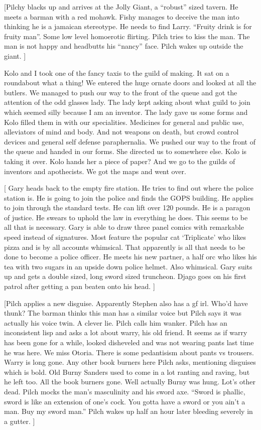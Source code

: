 [Pilchy blacks up and arrives at the Jolly Giant, a “robust” sized tavern. He meets a barman with a red mohawk. Fishy manages to deceive the man into thinking he is a jamaican stereotype. He needs to find Larry. “Fruity drink is for fruity man”. Some low level homoerotic flirting. Pilch tries to kiss the man. The man is not happy and headbutts his “nancy” face. Pilch wakes up outside the giant. ]\medskip

Kolo and I took one of the fancy taxis to the guild of making. It sat on a roundabout what a thing! We entered the huge ornate doors and looked at all the butlers. We managed to push our way to the front of the queue and got the attention of the odd glasses lady. The lady kept asking about what guild to join which seemed silly because I am an inventor. The lady gave us some forms and Kolo filled them in with our specialities. Medicines for general and public use, alleviators of mind and body. And not weapons on death, but crowd control devices and general self defense paraphernalia. We pushed our way to the front of the queue and handed in our forms. She directed us to somewhere else. Kolo is taking it over. Kolo hands her a piece of paper? And we go to the guilds of inventors and apothecists. We got the maps and went over.\medskip

[ Gary heads back to the empty fire station. He tries to find out where the police station is. He is going to join the police and finds the GOPS building. He applies to join through the standard tests. He can lift over 120 pounds. He is a paragon of justice. He swears to uphold the law in everything he does. This seems to be all that is necessary. Gary is able to draw three panel comics with remarkable speed instead of signatures. Most feature the popular cat ‘Triplicate’ who likes pizza and is by all accounts whimsical. That apparently is all that needs to be done to become a police officer. He meets his new partner, a half orc who likes his tea with two sugars in an upside down police helmet. Also whimsical. Gary suits up and gets a double sized, long sword sized truncheon. Djago goes on his first patrol after getting a pan beaten onto his head. ]\medskip

[Pilch applies a new disguise. Apparently Stephen also has a gf irl. Who’d have thunk? The barman thinks this man has a similar voice but Pilch says it was actually his voice twin. A clever lie. Pilch calls him wanker. Pilch has an inconsistent lisp and asks a lot about warry, his old friend. It seems as if warry has been gone for a while, looked disheveled and was not wearing pants last time he was here. We miss Otoria. There is some pedantisism about pants vs trousers. Warry is long gone. Any other book burners here Pilch asks, mentioning disguises which is bold. Old Burny Sanders used to come in a lot ranting and raving, but he left too. All the book burners gone. Well actually Burny was hung. Lot’s other dead. Pilch mocks the man’s masculinity and his sword axe. “Sword is phallic, sword is like an extension of one’s cock. You gotta have a sword or you ain’t a man. Buy my sword man.” Pilch wakes up half an hour later bleeding severely in a gutter. ]\medskip

